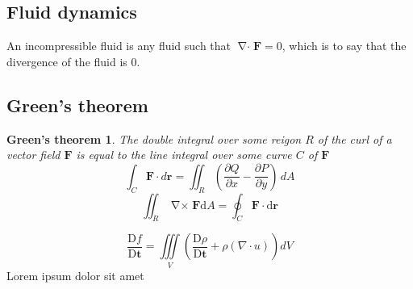 \documentclass[a4paper, 12pt]{article} %
\newcommand{\fatf}{\mathbf{F}} %
\newcommand{\materialder}[2]{\frac{\mathrm{D} #1}{\mathrm{D} #2}} %
\DeclareMathOperator{\divergence}{\nabla\cdot} %
\DeclareMathOperator{\curl}{\nabla\times} %
\newtheorem{greenstheorem}{Green's theorem}
\begin{document}
\subsection{Fluid dynamics}
An incompressible fluid is any fluid such that $\divergence\fatf=0$, which is to say that the divergence of the fluid is 0.

\subsection{Green's theorem}\label{sec:greenstheorem}
\begin{greenstheorem}
	The double integral over some reigon $R$ of the curl of a vector field $\fatf$ is equal to the line integral over some curve $C$ of $\fatf$
	$$\int_C \mathbf{F} \cdot d\mathbf{r} = \iint_R \left( \frac{\partial Q}{\partial x} - \frac{\partial P}{\partial y} \right) \, dA$$
	$$\iint_R\curl\fatf\mathrm{d}A=\oint_C\fatf\cdot\mathrm{d}\mathbf{r}$$
\end{greenstheorem}
\begin{equation} %
	\materialder{f}{\mathbf{t}}=\iiint\limits_{V}(\materialder{\rho}{\mathbf{t}}+\rho(\nabla\cdot u))dV
\end{equation}
Lorem ipsum dolor sit amet \cite{peyret2012computational}

\newpage


\renewcommand{\listfigurename}{\thesection\hspace{20pt}List of Figures}\listoffigures
\end{document}
